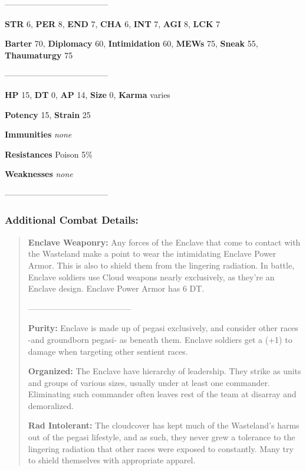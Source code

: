 \documentclass[11pt,a4paper,twocolumn]{book}
\begin{document}
	--------------------------------------

	\noindent
	\textbf{STR} 6, \textbf{PER} 8, \textbf{END} 7, \textbf{CHA} 6, \textbf{INT} 7, \textbf{AGI} 8, \textbf{LCK} 7
	
	\noindent
	\textbf{Barter} 70, \textbf{Diplomacy} 60, \textbf{Intimidation} 60, \textbf{MEWs} 75, \textbf{Sneak} 55, \textbf{Thaumaturgy} 75
	
	--------------------------------------
	
	\noindent
	\textbf{HP} 15, \textbf{DT} 0, \textbf{AP} 14, \textbf{Size} 0, \textbf{Karma} varies
	
	\noindent
	\textbf{Potency} 15, \textbf{Strain} 25
	
	\noindent
	\textbf{Immunities} \emph{none}
	
	\noindent
	\textbf{Resistances} Poison 5\%
	
	\noindent
	\textbf{Weaknesses} \emph{none} %
	
	--------------------------------------

	\subsubsection*{Additional Combat Details:}
	\begin{verse}
		\textbf{Enclave Weaponry:} Any forces of the Enclave that come to contact with the Wasteland make a point to wear the intimidating Enclave Power Armor. This is also to shield them from the lingering radiation. In battle, Enclave soldiers use Cloud weapons nearly exclusively, as they're an Enclave design. Enclave Power Armor has 6 DT.
		
		--------------------------------------
		
		\textbf{Purity:} Enclave is made up of pegasi exclusively, and consider other races -and groundborn pegasi- as beneath them. Enclave soldiers get a (+1) to damage when targeting other sentient races.
		
		\textbf{Organized:} The Enclave have hierarchy of leadership. They strike as units and groups of various sizes, usually under at least one commander. Eliminating such commander often leaves rest of the team at disarray and demoralized.
		
		\textbf{Rad Intolerant:} The cloudcover has kept much of the Wasteland's harms out of the pegasi lifestyle, and as such, they never grew a tolerance to the lingering radiation that other races were exposed to constantly. Many try to shield themselves with appropriate apparel.
		
	\end{verse}
	
\end{document}
